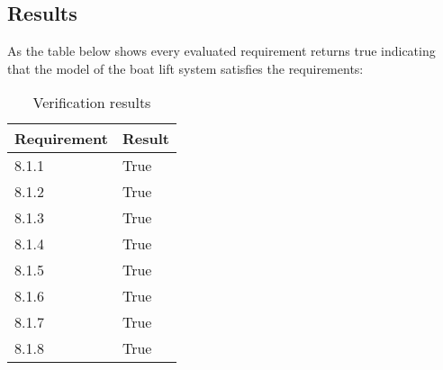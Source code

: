 \subsection{Results}
As the table below shows every evaluated requirement returns true indicating that the model of the boat lift system satisfies the requirements:

\begin{table}[htbp]
	\centering
	\begin{tabular}{ll}
		\toprule
		\textbf{Requirement} &  \textbf{Result} \\
		\hline
		8.1.1&  True \\
		8.1.2&  True \\
		8.1.3&  True \\
		8.1.4&  True \\
		8.1.5&  True \\
		8.1.6&  True \\
		8.1.7&  True \\
		8.1.8&  True \\
		\bottomrule
	\end{tabular}%
	\caption{Verification results}
	\label{tab:sort}%
\end{table}%
